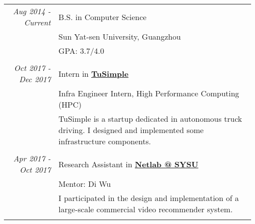 \documentclass[a4paper,10pt]{article} %
\begin{document}
\begin{tabular}{r|p{11cm}}
\emph{Aug 2014 - Current} & B.S. in Computer Science \\
& Sun Yat-sen University, Guangzhou\\ 
& GPA: 3.7/4.0 \\


\multicolumn{2}{c}{} \\


\emph{Oct 2017 - Dec 2017} & Intern in \href{http://www.tusimple.com/index-en.html}{\textbf{TuSimple}} \\
& Infra Engineer Intern, High Performance Computing (HPC) \\
& \footnotesize{TuSimple is a startup dedicated in autonomous truck driving. I designed and implemented some infrastructure components.}\\

\multicolumn{2}{c}{} \\

\emph{Apr 2017 - Oct 2017} & Research Assistant in \href{http://netlabsysu.org}{\textbf{Netlab @ SYSU}} \\
& Mentor: Di Wu\\ 
& \footnotesize{I participated in the design and implementation of a large-scale commercial video recommender system. }\\


\multicolumn{2}{c}{} 





\end{tabular}
\end{document}
